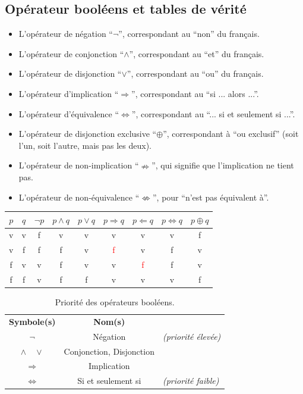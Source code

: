 \documentclass[12]{article}%
\theoremstyle{plain}
\theoremstyle{definition}
\theoremstyle{remark}
\begin{document}
\subsection{Opérateur booléens et tables de vérité}
\begin{itemize}
	\item L’opérateur de négation ``\(\lnot\)'', correspondant au ``non'' du français.
	\item L’opérateur de conjonction ``\(\land\)'', correspondant au ``et'' du français.
	\item L’opérateur de disjonction ``\(\lor\)'', correspondant au ``ou'' du français.
	\item L’opérateur d’implication ``\(\Rightarrow\)'', correspondant au ``si ... alors ...''.
	\item L’opérateur d'équivalence ``\(\Leftrightarrow\)'', correspondant au ``... si et seulement si ...''.
	\item L’opérateur de disjonction exclusive ``\(\oplus\)'', correspondant à ``ou exclusif'' (soit l’un, soit l’autre, mais pas les deux).
	\item L’opérateur de non-implication ``\(\nRightarrow\)'', qui signifie que l’implication ne tient pas.
	\item L’opérateur de non-équivalence ``\(\not\Leftrightarrow\)'', pour ``n'est pas équivalent à''.
\end{itemize}

\begin{center}
	\begin{tabular}{|c|c|c|c|c|c|c|c|c|}
		\hline
		$p$ & $q$ & $\lnot p$ & $p \land q$ & $p \lor q$ & $p \Rightarrow q$ & $p \Leftarrow q$ & $p \Leftrightarrow q$ & $p \oplus q$ \\
		\hline
		v & v & f & v & v & v & v & v & f \\
		v & f & f & f & v & \textcolor{red}{f} & v & f & v \\
		f & v & v & f & v & v & \textcolor{red}{f} & f & v \\
		f & f & v & f & f & v & v & v & f \\
		\hline
	\end{tabular}
\end{center} 

\begin{table}[h!]
	\centering
	\caption{Priorité des opérateurs booléens.}
	\begin{tabular}{@{}c@{\quad}c@{\qquad}l@{}}
		\textbf{Symbole(s)} & \textbf{Nom(s)} &  \\
		$\neg$              & Négation        & \textit{(priorité élevée) }\\
		$\land \quad \lor$  & Conjonction, Disjonction &                   \\
		$\Rightarrow$       & Implication     &                              \\
		$\Leftrightarrow$   & Si et seulement si & \textit{(priorité faible)} \\
	\end{tabular}
\end{table}
\end{document}
